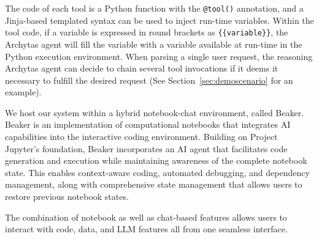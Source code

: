 The code of each tool is a Python function with the \verb|@tool()| annotation, and a Jinja-based templated syntax can be used to inject run-time variables.
Within the tool code, if a variable is expressed in round brackets as \texttt{\{\{variable\}\}}, the Archytas agent will fill the variable with a variable available at run-time in the Python execution environment.
When parsing a single user request, the reasoning Archytas agent can decide to chain several tool invocations if it deems it necessary to fulfill the desired request (See Section~\ref{sec:demoscenario} for an example).


We host our \chat{} system within a hybrid notebook-chat environment, called Beaker. 
Beaker is an implementation of computational notebooks that integrates AI capabilities into the interactive coding environment. 
Building on Project Jupyter's foundation, Beaker incorporates an AI agent that facilitates code generation and execution while maintaining awareness of the complete notebook state.
This enables context-aware coding, automated debugging, and dependency management, along with comprehensive state management that allows users to restore previous notebook states.

The combination of notebook as well as chat-based features allows users to interact with code, data, and LLM features all from one seamless interface. 

% 

